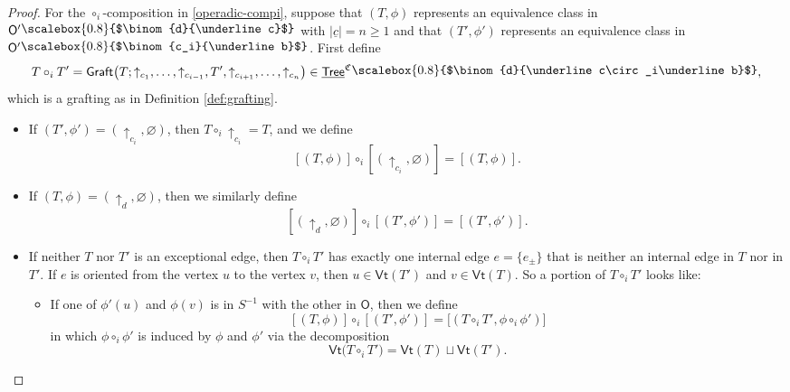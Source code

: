 \documentclass{amsbook}
\numberwithin{section}{chapter}
\numberwithin{subsection}{section}
\numberwithin{equation}{section}
\theoremstyle{plain}
\theoremstyle{definition}
\newcommand{\colorc}{\mathfrak{C}}
\newcommand{\graft}{\mathsf{Graft}}
\newcommand{\Vt}{\mathsf{Vt}}
\renewcommand{\O}{\mathsf{O}}
\newcommand{\compi}{\circ_i}
\newcommand{\inv}[1]{{#1}^{-1}}
\newcommand{\Sinv}{\inv{S}}
\newcommand{\Tree}{\mathsf{Tree}}
\newcommand{\uTree}{\underline{\Tree}}
\newcommand{\uTreec}{\uTree^{\colorc}}
\newcommand{\ub}{\underline b}
\newcommand{\uc}{\underline c}
\newcommand{\smallprof}[1]
{\raisebox{.05cm}{\scalebox{0.8}{#1}}}
\newcommand{\sbinom}[2]{\raisebox{.05cm}{\scalebox{0.8}{$\binom{#1}{#2}$}}}
\newcommand{\ciub}{\smallprof{$\binom{c_i}{\ub}$}}
\newcommand{\duc}{\smallprof{$\binom{d}{\uc}$}}
\begin{document}
\begin{proof}
For the $\compi$-composition in \eqref{operadic-compi}, suppose that $(T,\phi)$ represents an equivalence class in $\O'\duc$ with $|\uc|=n\geq 1$ and that $(T',\phi')$ represents an equivalence class in $\O'\ciub$.  First define
\begin{equation}\label{tree-compi}
T\compi T' = \graft\bigl(T; \uparrow_{c_1},\ldots,\uparrow_{c_{i-1}},T',\uparrow_{c_{i+1}},\ldots,\uparrow_{c_n}\bigr) \in \uTreec\sbinom{d}{\uc\compi\ub},
\end{equation}
which is a grafting as in Definition \ref{def:grafting}.
\begin{itemize}
\item If $(T',\phi') = (\uparrow_{c_i},\varnothing)$, then $T \compi \uparrow_{c_i} = T$, and we define
\[[(T,\phi)] \compi [(\uparrow_{c_i},\varnothing)] = [(T,\phi)].\]
\item If $(T,\phi) = (\uparrow_d,\varnothing)$, then we similarly define
\[[(\uparrow_d,\varnothing)] \compi [(T',\phi')] = [(T',\phi')].\]
\item If neither $T$ nor $T'$ is an exceptional edge, then $T\compi T'$ has exactly one internal edge $e=\{e_{\pm}\}$ that is neither an internal edge in $T$ nor in $T'$.  If $e$ is oriented from the vertex $u$ to the vertex $v$, then $u \in \Vt(T')$ and $v \in \Vt(T)$.  So a portion of $T\compi T'$ looks like:
\begin{center}\end{center}
\begin{itemize}
\item If one of $\phi'(u)$ and $\phi(v)$ is in $\Sinv$ with the other in $\O$, then we define
\begin{equation}\label{osinv-compi}
[(T,\phi)] \compi [(T',\phi')] = \bigl[(T\compi T',\phi\compi\phi')\bigr]
\end{equation}
in which $\phi\compi\phi'$ is induced by $\phi$ and $\phi'$ via the decomposition \[\Vt\bigl(T\compi T'\bigr) = \Vt(T) \sqcup \Vt(T').\]

\end{itemize}
\end{itemize}
\end{proof}
\end{document}
